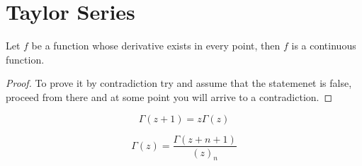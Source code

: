 \section{Taylor Series}

\begin{theorem}
    Let $f$ be a function whose derivative exists in every point, then $f$
    is a continuous function.
\end{theorem}

\begin{proof}
    To prove it by contradiction try and assume that the statemenet is false,
    proceed from there and at some point you will arrive to a contradiction.
\end{proof}

$$\Gamma (z+1) = z \Gamma (z)$$

$$\Gamma (z) = \frac {\Gamma (z+n+1)}{(z)_n}$$